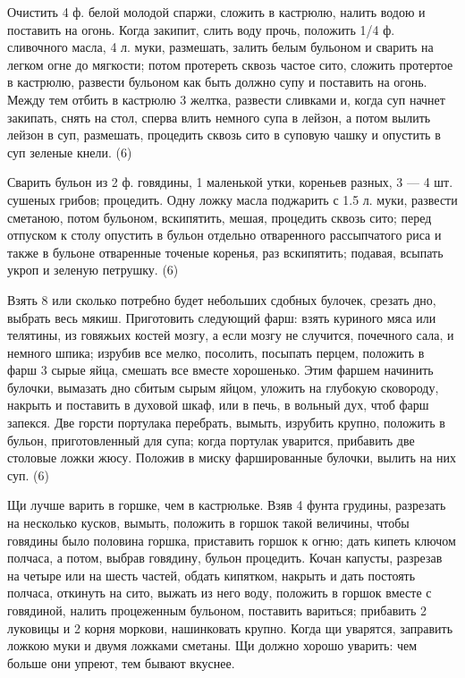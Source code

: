 
Очистить 4 ф. белой молодой спаржи, сложить в кастрюлю, налить водою и поставить на огонь. Когда закипит, слить воду прочь, положить 1/4 ф. сливочного масла, 4 л. муки, размешать, залить белым бульоном и сварить на легком огне до мягкости; потом протереть сквозь частое сито, сложить протертое в кастрюлю, развести бульоном как быть должно супу и поставить на огонь. Между тем отбить в кастрюлю 3 желтка, развести сливками и, когда суп начнет закипать, снять на стол, сперва влить немного супа в лейзон, а потом вылить лейзон в суп, размешать, процедить сквозь сито в суповую чашку и опустить в суп зеленые кнели. (6)


Сварить бульон из 2 ф. говядины, 1 маленькой утки, кореньев разных, 3 — 4 шт. сушеных грибов; процедить. Одну ложку масла поджарить с 1.5 л. муки, развести сметаною, потом бульоном, вскипятить, мешая, процедить сквозь сито; перед отпуском к столу опустить в бульон отдельно отваренного рассыпчатого риса и также в бульоне отваренные точеные коренья, раз вскипятить; подавая, всыпать укроп и зеленую петрушку. (6)


Взять 8 или сколько потребно будет небольших сдобных булочек, срезать дно, выбрать весь мякиш. Приготовить следующий фарш: взять куриного мяса или телятины, из говяжьих костей мозгу, а если мозгу не случится, почечного сала, и немного шпика; изрубив все мелко, посолить, посыпать перцем, положить в фарш 3 сырые яйца, смешать все вместе хорошенько. Этим фаршем начинить булочки, вымазать дно сбитым сырым яйцом, уложить на глубокую сковороду, накрыть и поставить в духовой шкаф, или в печь, в вольный дух, чтоб фарш запекся. Две горсти портулака перебрать, вымыть, изрубить крупно, положить в бульон, приготовленный для супа; когда портулак уварится, прибавить две столовые ложки жюсу. Положив в миску фаршированные булочки, вылить на них суп. (6)


Щи лучше варить в горшке, чем в кастрюльке. Взяв 4 фунта грудины, разрезать на несколько кусков, вымыть, положить в горшок такой величины, чтобы говядины было половина горшка, приставить горшок к огню; дать кипеть ключом полчаса, а потом, выбрав говядину, бульон процедить. Кочан капусты, разрезав на четыре или на шесть частей, обдать кипятком, накрыть и дать постоять полчаса, откинуть на сито, выжать из него воду, положить в горшок вместе с говядиной, налить процеженным бульоном, поставить вариться; прибавить 2 луковицы и 2 корня моркови, нашинковать крупно. Когда щи уварятся, заправить ложкою муки и двумя ложками сметаны. Щи должно хорошо уварить: чем больше они упреют, тем бывают вкуснее.

